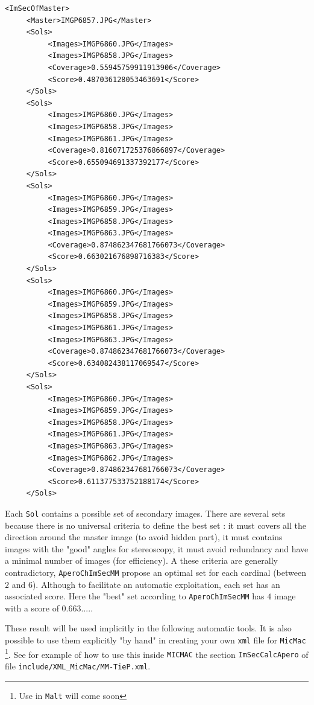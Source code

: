 {\small
\begin{verbatim}
<ImSecOfMaster>
     <Master>IMGP6857.JPG</Master>
     <Sols>
          <Images>IMGP6860.JPG</Images>
          <Images>IMGP6858.JPG</Images>
          <Coverage>0.55945759911913906</Coverage>
          <Score>0.487036128053463691</Score>
     </Sols>
     <Sols>
          <Images>IMGP6860.JPG</Images>
          <Images>IMGP6858.JPG</Images>
          <Images>IMGP6861.JPG</Images>
          <Coverage>0.816071725376866897</Coverage>
          <Score>0.655094691337392177</Score>
     </Sols>
     <Sols>
          <Images>IMGP6860.JPG</Images>
          <Images>IMGP6859.JPG</Images>
          <Images>IMGP6858.JPG</Images>
          <Images>IMGP6863.JPG</Images>
          <Coverage>0.874862347681766073</Coverage>
          <Score>0.663021676898716383</Score>
     </Sols>
     <Sols>
          <Images>IMGP6860.JPG</Images>
          <Images>IMGP6859.JPG</Images>
          <Images>IMGP6858.JPG</Images>
          <Images>IMGP6861.JPG</Images>
          <Images>IMGP6863.JPG</Images>
          <Coverage>0.874862347681766073</Coverage>
          <Score>0.634082438117069547</Score>
     </Sols>
     <Sols>
          <Images>IMGP6860.JPG</Images>
          <Images>IMGP6859.JPG</Images>
          <Images>IMGP6858.JPG</Images>
          <Images>IMGP6861.JPG</Images>
          <Images>IMGP6863.JPG</Images>
          <Images>IMGP6862.JPG</Images>
          <Coverage>0.874862347681766073</Coverage>
          <Score>0.611377533752188174</Score>
     </Sols>
\end{verbatim}
}

Each {\tt Sol} contains a possible set of secondary images. There are several sets because there is no universal
criteria to define the best set : it must covers  all the direction around the master image
(to avoid hidden part), it must contains images with the "good" angles for stereoscopy, it
must avoid redundancy and have a minimal number of images (for efficiency). A these criteria
are generally contradictory, {\tt AperoChImSecMM} propose an optimal set for each cardinal
(between $2$ and $6$). Although to facilitate an automatic exploitation, each set has an
associated score. Here the "best" set according to {\tt AperoChImSecMM} has $4$ image with
a score of $0.663....$.

These result will be used implicitly in the following automatic tools. It is also possible to use them explicitly
"by hand" in creating your own {\tt xml} file for {\tt MicMac} \footnote{Use in {\tt Malt} will come soon}.
See for example of how to use this inside {\tt MICMAC} the section {\tt ImSecCalcApero} of file
{\tt include/XML\_MicMac/MM-TieP.xml}.


